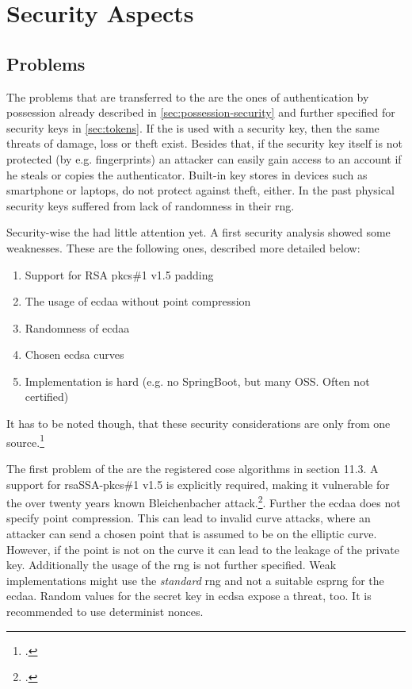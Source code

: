 \section{Security Aspects}


\subsection{Problems}

The problems that are transferred to the \wa{} are the ones of authentication by possession already described in \autoref{sec:possession-security} and further specified for security keys in \autoref{sec:tokens}. If the \wa{} is used with a security key, then the same threats of damage, loss or theft exist. Besides that, if the security key itself is not protected (by e.g. fingerprints) an attacker can easily gain access to an account if he steals or copies the authenticator. Built-in key stores in devices such as smartphone or laptops, do not protect against theft, either. In the past physical security keys suffered from lack of randomness in their \gls{rng}.

Security-wise the \wa{} had little attention yet. A first security analysis showed some weaknesses. These are the following ones, described more detailed below:

\begin{enumerate}
	\item Support for RSA \gls{pkcs}\#1 v1.5 padding
	\item The usage of \gls{ecdaa} without point compression
	\item Randomness of \gls{ecdaa}
	\item Chosen \gls{ecdsa} curves
 	\item Implementation is hard (e.g. no SpringBoot, but many OSS. Often not certified)
\end{enumerate}

It has to be noted though, that these security considerations are only from one source.\footcite[See][]{paragon-webauth}

The first problem of the \wa{} are the registered \gls{cose} algorithms in section 11.3. A support for \gls{rsa}SSA-\gls{pkcs}\#1 v1.5 is explicitly required, making it vulnerable for the over twenty years known \frqq Bleichenbacher attack\flqq.\footcites[See][]{10.1007/BFb0055716}. Further the \gls{ecdaa} does not specify point compression. This can lead to invalid curve attacks, where an attacker can send a chosen point that is assumed to be on the elliptic curve. However, if the point is not on the curve it can lead to the leakage of the private key. Additionally the usage of the \gls{rng} is not further specified. Weak implementations might use the \textit{standard} \gls{rng} and not a suitable \gls{csprng} for the \gls{ecdaa}. Random values for the secret key in \gls{ecdsa} expose a threat, too. It is recommended to use determinist \glspl{nonce}.

